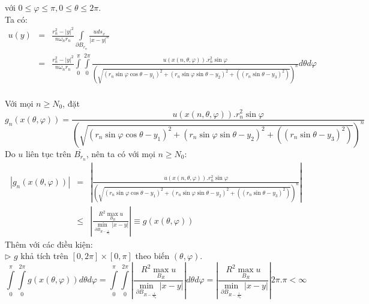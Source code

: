 với $
0 \leqslant \varphi  \leqslant \pi ,0 \leqslant \theta  \leqslant 2\pi 
$.\\
Ta có:
\begin{eqnarray}
u\left( y \right)& = &\frac{{r_n ^2  - \left| y \right|^2 }}
{{n\omega _n r_n }}\int\limits_{\partial B_{r_n } } {\frac{{uds_x }}
{{\left| {x - y} \right|^n }}}\nonumber\\
& = &\frac{{r_n ^2  - \left| y \right|^2 }}
{{n\omega _n r_n }}\int\limits_0^\pi  {\int\limits_0^{2\pi } {\frac{{u\left( {x\left( {n,\theta ,\varphi } \right)} \right).r_n^2 \sin \varphi }}
{{\left( {\sqrt {\left( {r_n \sin \varphi \cos \theta  - y_1 } \right)^2  + \left( {r_n \sin \varphi \sin \theta  - y_2 } \right)^2  + \left( {\left( {r_n \sin \theta  - y_3 } \right)^2 } \right)} } \right)^n }}d\theta d\varphi } }  \nonumber
\end{eqnarray}
\\ Với mọi $
n \geqslant N_0 
$, đặt
\[
g_n \left( {x\left( {\theta ,\varphi } \right)} \right) = \frac{{u\left( {x\left( {n,\theta ,\varphi } \right)} \right).r_n^2 \sin \varphi }}
{{\left( {\sqrt {\left( {r_n \sin \varphi \cos \theta  - y_1 } \right)^2  + \left( {r_n \sin \varphi \sin \theta  - y_2 } \right)^2  + \left( {\left( {r_n \sin \theta  - y_3 } \right)^2 } \right)} } \right)^n }}
\]
Do $u$ liên tục trên $
\overline {B_{r_n} } 
$, nên ta có với mọi $
n \geqslant N_0 
$:
\begin{eqnarray}
\left| {g_n \left( {x\left( {\theta ,\varphi } \right)} \right)} \right| & =& \left| {\frac{{u\left( {x\left( {n,\theta ,\varphi } \right)} \right).r_n^2 \sin \varphi }}
{{\left( {\sqrt {\left( {r_n \sin \varphi \cos \theta  - y_1 } \right)^2  + \left( {r_n \sin \varphi \sin \theta  - y_2 } \right)^2  + \left( {\left( {r_n \sin \theta  - y_3 } \right)^2 } \right)} } \right)^n }}} \right|\nonumber\\
& \leqslant &\left| {\frac{{R^2 \mathop {\max }\limits_{B_R } u}}
{{\mathop {\min }\limits_{\partial B_{R - \frac{1}
{{N_0 }}} } \left| {x - y} \right|}}} \right| \equiv g \left( {x\left( {\theta ,\varphi } \right)} \right)\nonumber
\end{eqnarray}
Thêm với các điều kiện:\\
$\triangleright$ $g$ khả tích trên $
\left[ {0,2\pi } \right] \times \left[ {0,\pi } \right]
$ theo biến $
{\left( {\theta ,\varphi } \right)}
$.
\[
\int\limits_0^\pi  {\int\limits_0^{2\pi } {g\left( {x\left( {\theta ,\varphi } \right)} \right)d\theta d\varphi } }  = \int\limits_0^\pi  {\int\limits_0^{2\pi } {\left| {\frac{{R^2 \mathop {\max }\limits_{B_R } u}}
{{\mathop {\min }\limits_{\partial B_{R - \frac{1}
{{N_0 }}} } \left| {x - y} \right|}}} \right|d\theta d\varphi } }  = \left| {\frac{{R^2 \mathop {\max }\limits_{B_R } u}}
{{\mathop {\min }\limits_{\partial B_{R - \frac{1}
{{N_0 }}} } \left| {x - y} \right|}}} \right|2\pi .\pi  < \infty 
\]
